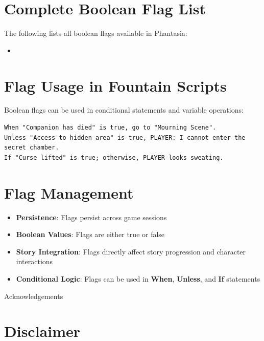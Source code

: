 \documentclass[11pt,letterpaper,oldstylefigures]{memoir}
\makeatletter
\let\oldchapter\chapter
\def\chapter{%
  \@ifstar
    {\FountainScripting@starchapter}%
    {\@dblarg\FountainScripting@chapter}}
\def\FountainScripting@starchapter#1{\oldchapter*{#1}\chaptermark{#1}}
\def\FountainScripting@chapter[#1]#2{\oldchapter[#1]{#2}\chaptermark{#2}}
\newcommand{\fountain}[1]{\textbf{#1}}
\newcommand{\Phantasia}{{\irishfont Phantasia}}
\makeatother
\begin{document}
\section{Complete Boolean Flag List}

The following lists all boolean flags available in \Phantasia{}:

\begin{itemize}
\item [TODO: Document actual flags from source code]
\end{itemize}

\section{Flag Usage in Fountain Scripts}

Boolean flags can be used in conditional statements and variable operations:

\begin{verbatim}
When "Companion has died" is true, go to "Mourning Scene".
Unless "Access to hidden area" is true, PLAYER: I cannot enter the secret chamber.
If "Curse lifted" is true; otherwise, PLAYER looks sweating.
\end{verbatim}

\section{Flag Management}

\begin{itemize}
\item \textbf{Persistence}: Flags persist across game sessions
\item \textbf{Boolean Values}: Flags are either true or false
\item \textbf{Story Integration}: Flags directly affect story progression and character interactions
\item \textbf{Conditional Logic}: Flags can be used in \fountain{When}, \fountain{Unless}, and \fountain{If} statements
\end{itemize}

\chapter{Acknowledgements}
\label{app:acknowledgements}

\section{Disclaimer}
\end{document}
